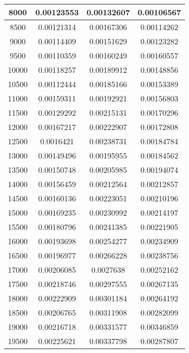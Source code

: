 \documentclass{article}
\begin{document}
\begin{longtable}{|c|c|c|c|}
		    8000   &  0.00123553    & 	0.00132607	 &  0.00106567  \\ \hline
		    8500   &  0.00121314    & 	0.00167306	 &  0.00114262  \\ \hline
		    9000   &  0.00114409    & 	0.00151629	 &  0.00123282  \\ \hline
		    9500   &  0.00110359    & 	0.00160249	 &  0.00160557  \\ \hline
		    10000  &  0.00118257    & 	0.00189912	 &  0.00148856  \\ \hline
		    10500  &  0.00112444    & 	0.00185166	 &  0.00153389  \\ \hline
		    11000  &  0.00159311    & 	0.00192921	 &  0.00156803  \\ \hline
		    11500  &  0.00129292    & 	0.00215131	 &  0.00170296  \\ \hline
		    12000  &  0.00167217    & 	0.00222907	 &  0.00172808  \\ \hline
		    12500  &  0.0016421	    &   0.00238731	 &  0.00184784  \\ \hline
		    13000  &  0.00149496    & 	0.00195955	 &  0.00184562  \\ \hline
		    13500  &  0.00150748    & 	0.00205985	 &  0.00194074  \\ \hline
		    14000  &  0.00156459    & 	0.00212564	 &  0.00212857  \\ \hline
		    14500  &  0.00160136    & 	0.00223051	 &  0.00210196  \\ \hline
		    15000  &  0.00169235    & 	0.00230992	 &  0.00214197  \\ \hline
		    15500  &  0.00180796    & 	0.00241385	 &  0.00221905  \\ \hline
		    16000  &  0.00193698    & 	0.00254277	 &  0.00234909  \\ \hline
		    16500  &  0.00196977    & 	0.00266228	 &  0.00238756  \\ \hline
		    17000  &  0.00206085    & 	0.0027638	 &  0.00252162  \\ \hline
		    17500  &  0.00218746    & 	0.00297555	 &  0.00267135  \\ \hline
		    18000  &  0.00222909    & 	0.00301184	 &  0.00264192  \\ \hline
		    18500  &  0.00206765    & 	0.00311908	 &  0.00282099  \\ \hline
		    19000  &  0.00216718    & 	0.00331577	 &  0.00346859  \\ \hline
		    19500  &  0.00225621    & 	0.00337798	 &  0.00287807  \\ \hline

\end{longtable}
\end{document}
